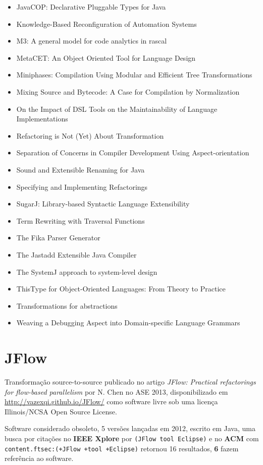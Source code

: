 \begin{itemize}
\item JavaCOP: Declarative Pluggable Types for Java
\item Knowledge-Based Reconfiguration of Automation Systems
\item M3: A general model for code analytics in rascal
\item MetaCET: An Object Oriented Tool for Language Design
\item Miniphases: Compilation Using Modular and Efficient Tree Transformations
\item Mixing Source and Bytecode: A Case for Compilation by Normalization
\item On the Impact of DSL Tools on the Maintainability of Language Implementations
\item Refactoring is Not (Yet) About Transformation
\item Separation of Concerns in Compiler Development Using Aspect-orientation
\item Sound and Extensible Renaming for Java
\item Specifying and Implementing Refactorings
\item SugarJ: Library-based Syntactic Language Extensibility
\item Term Rewriting with Traversal Functions
\item The Fika Parser Generator
\item The Jastadd Extensible Java Compiler
\item The SystemJ approach to system-level design
\item ThisType for Object-Oriented Languages: From Theory to Practice
\item Transformations for abstractions
\item Weaving a Debugging Aspect into Domain-specific Language Grammars
\end{itemize}

\section{JFlow}

Transformação source-to-source
publicado no artigo {\it JFlow: Practical refactorings for flow-based parallelism}
por N. Chen
no ASE 2013,
disponibilizado em \url{http://vazexqi.github.io/JFlow/}
como software livre
sob uma licença Illinois/NCSA Open Source License.

Software considerado obsoleto,
5 versões lançadas
em 2012,
escrito em Java,
uma busca por citações no {\bf IEEE Xplore} por
\texttt{(JFlow tool Eclipse)}
e no {\bf ACM} com
\texttt{content.ftsec:(+JFlow +tool +Eclipse)}
retornou
16 resultados,
{\bf 6} fazem referência ao software.

